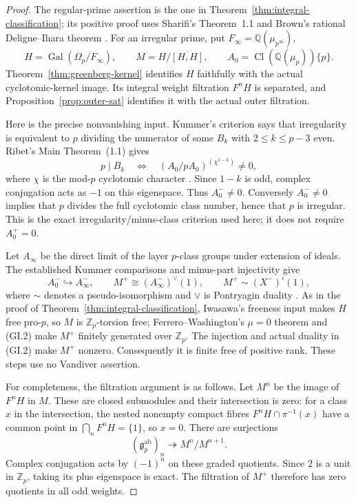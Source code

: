 \documentclass[11pt,a4paper]{article}
\theoremstyle{definition}
\begin{document}
\begin{proof}
The regular-prime assertion is the one in
Theorem~\ref{thm:integral-classification}; its positive proof uses
Sharifi's Theorem~1.1 and Brown's rational Deligne--Ihara theorem
\cite[Theorem~1.1]{Sharifi2002}\cite[\S\S2.1--2.3]{Brown2019}.
For an irregular prime, put $F_\infty=\mathbb Q(\mu_{p^\infty})$,
\[
 H=\operatorname{Gal}(\Omega_p/F_\infty),\qquad
 M=H/\overline{[H,H]},\qquad
 A_0=\operatorname{Cl}(\mathbb Q(\mu_p))\{p\}.
\]
Theorem~\ref{thm:greenberg-kernel} identifies $H$ faithfully with
the actual cyclotomic-kernel image.  Its integral weight filtration
$F^nH$ is separated, and Proposition~\ref{prop:outer-sat}
identifies it with the actual outer filtration.

Here is the precise nonvanishing input.  Kummer's criterion says that
irregularity is equivalent to $p$ dividing the numerator of some
$B_k$ with $2\le k\le p-3$ even.  Ribet's Main Theorem~(1.1) gives
\[
 p\mid B_k
 \quad\Longleftrightarrow\quad
 (A_0/pA_0)^{(\chi^{1-k})}\ne0,
 \tag{GI.1}
\]
where $\chi$ is the mod-$p$ cyclotomic character
\cite[\S1, p.~151, Main Theorem~(1.1)]{Ribet1976}.
Since $1-k$ is odd, complex conjugation acts as $-1$ on this
eigenspace.  Thus $A_0^-\ne0$.  Conversely $A_0^-\ne0$ implies
that $p$ divides the full cyclotomic class number, hence that $p$
is irregular.  This is the exact irregularity/minus-class criterion
used here; it does not require $A_0^+=0$.

Let $A_\infty$ be the direct limit of the layer $p$-class groups
under extension of ideals.  The established Kummer comparisons and
minus-part injectivity give
\[
 A_0^-\hookrightarrow A_\infty^-,\qquad
 M^+\cong(A_\infty^-)^\vee(1),\qquad
 M^+\sim(X^-)^\iota(1),
 \tag{GI.2}
\]
where $\sim$ denotes a pseudo-isomorphism and $\vee$ is
Pontryagin duality
\cite[Propositions~3.4.1 and~3.4.7, Corollary~3.4.8]{SharifiIwasawaNotes}.
As in the proof of Theorem~\ref{thm:integral-classification},
Iwasawa's freeness input makes $H$ free pro-$p$, so $M$ is
$\mathbb Z_p$-torsion free; Ferrero--Washington's $\mu=0$
theorem and (GI.2) make $M^+$ finitely generated over $\mathbb Z_p$.
The injection and actual duality in (GI.2) make $M^+$ nonzero.
Consequently it is finite free of positive rank.  These steps use
no Vandiver assertion.

For completeness, the filtration argument is as follows.  Let
$M^n$ be the image of $F^nH$ in $M$.  These are closed submodules
and their intersection is zero: for a class $x$ in the intersection,
the nested nonempty compact fibres
$F^nH\cap\pi^{-1}(x)$ have a common point in
$\bigcap_nF^nH=\{1\}$, so $x=0$.
There are surjections
\[
 (\mathfrak g_p^{\mathrm{ab}})_n
 \twoheadrightarrow M^n/M^{n+1}.
 \tag{GI.3}
\]
Complex conjugation acts by $(-1)^n$ on these graded quotients.
Since $2$ is a unit in $\mathbb Z_p$, taking its plus eigenspace
is exact.  The filtration of $M^+$ therefore has zero quotients
in all odd weights.


\end{proof}
\end{document}
